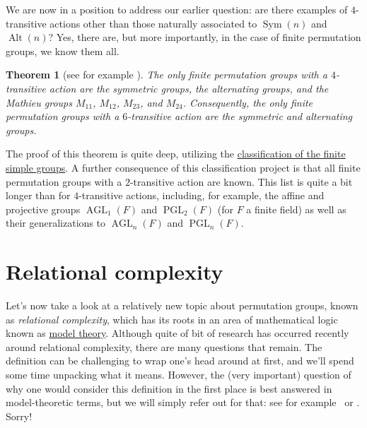 \documentclass[11pt]{amsart}
\theoremstyle{plain}
\newtheorem*{theorem*}{Theorem}
\theoremstyle{definition}
\theoremstyle{remark}
\DeclareMathOperator{\Sym}{Sym}
\DeclareMathOperator{\Alt}{Alt}
\DeclareMathOperator{\AGL}{AGL}
\DeclareMathOperator{\PGL}{PGL}
\begin{document}
We are now in a position to address our earlier question: are there examples of $4$-transitive actions other than those naturally associated to $\Sym(n)$ and $\Alt(n)$? Yes, there are, but  more importantly, in the case of finite permutation groups, we know them all.

\begin{theorem*}[see for example {\cite[Theorem~4.11]{CaP99}}]
The only finite permutation groups with a $4$-transitive action are the symmetric groups, the alternating groups, and the Mathieu groups $M_{11}$, $M_{12}$, $M_{23}$, and $M_{24}$. Consequently, the only finite permutation groups with a $6$-transitive action are the symmetric and alternating groups.
\end{theorem*}

The proof of this theorem is quite deep, utilizing the \href{https://en.wikipedia.org/wiki/Classification_of_finite_simple_groups}{classification of the finite simple groups}. A further consequence of this classification project is that all finite permutation groups with a $2$-transitive action are known. This list is quite a bit longer than for $4$-transitive actions, including, for example, the affine and projective groups $\AGL_1(F)$ and $\PGL_2(F)$ (for $F$ a finite field) as well as their generalizations to $\AGL_n(F)$ and $\PGL_n(F)$. 


\section{Relational complexity}\label{S:rcomp}

Let's now take a look at a relatively new topic about permutation groups, known as \emph{relational complexity}, which has its roots in an area of mathematical logic known as \href{https://en.wikipedia.org/wiki/Model_theory}{model theory}. Although quite of bit of research has occurred recently around relational complexity, there are many questions that remain.
The definition can be challenging to wrap one's head around at first, and we'll spend some time unpacking what it means. However, the (very important) question of why one would consider this definition in the first place is best answered in model-theoretic terms, but we will simply refer out for that: see for example~\cite[Section~2]{ChG00} or \cite[Section~2.2]{WiJ16b}. Sorry!
\end{document}
